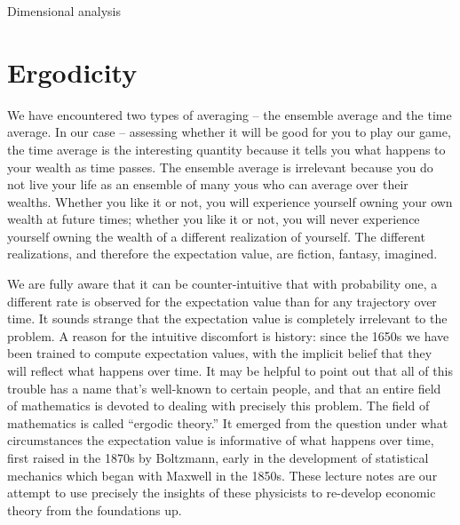 \begin{excursion}{Dimensional analysis}
%
\end{excursion}

\section{Ergodicity}
We have encountered two types of averaging -- the ensemble average and the time average. In our case -- assessing whether it will be good for you to play our game, the time average is the interesting quantity because it tells you what happens to your wealth as time passes. The ensemble average is irrelevant because you do not live your life as an ensemble of many yous who can average over their wealths. Whether you like it or not, you will experience yourself owning your own wealth at future times; whether you like it or not, you will never experience yourself owning the wealth of a different realization of yourself. The different realizations, and therefore the expectation value, are fiction, fantasy, imagined.

We are fully aware that it can be counter-intuitive that with probability one, a different rate is observed for the expectation value than for any trajectory over time. It sounds strange that the expectation value is completely irrelevant to the problem. A reason for the intuitive discomfort is history: since the 1650s we have been trained to compute expectation values, with the implicit belief that they will reflect what happens over time. It may be helpful to point out that all of this trouble has a name that's well-known to certain people, and that an entire field of mathematics is devoted to dealing with precisely this problem. The field of mathematics is called ``ergodic theory.'' It emerged from the question under what circumstances the expectation value is informative 
of what happens over time, first raised in the 1870s by Boltzmann, early in the development of statistical mechanics which began with Maxwell in the 1850s. These lecture notes are our attempt to use precisely the insights of these physicists to re-develop economic theory from the foundations up.

